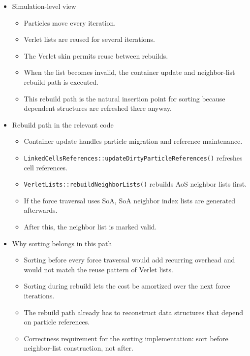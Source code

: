 \begin{itemize}
    \item Simulation-level view
    \begin{itemize}
        \item Particles move every iteration.
        \item Verlet lists are reused for several iterations.
        \item The Verlet skin permits reuse between rebuilds.
        \item When the list becomes invalid, the container update and neighbor-list rebuild path is executed.
        \item This rebuild path is the natural insertion point for sorting because dependent structures are refreshed there anyway.
    \end{itemize}

    \item Rebuild path in the relevant code
    \begin{itemize}
        \item Container update handles particle migration and reference maintenance.
        \item \texttt{LinkedCellsReferences::updateDirtyParticleReferences()} refreshes cell references.
        \item \texttt{VerletLists::rebuildNeighborLists()} rebuilds AoS neighbor lists first.
        \item If the force traversal uses SoA, SoA neighbor index lists are generated afterwards.
        \item After this, the neighbor list is marked valid.
    \end{itemize}

    \item Why sorting belongs in this path
    \begin{itemize}
        \item Sorting before every force traversal would add recurring overhead and would not match the reuse pattern of Verlet lists.
        \item Sorting during rebuild lets the cost be amortized over the next force iterations.
        \item The rebuild path already has to reconstruct data structures that depend on particle references.
        \item Correctness requirement for the sorting implementation: sort before neighbor-list construction, not after.
    \end{itemize}
\end{itemize}

